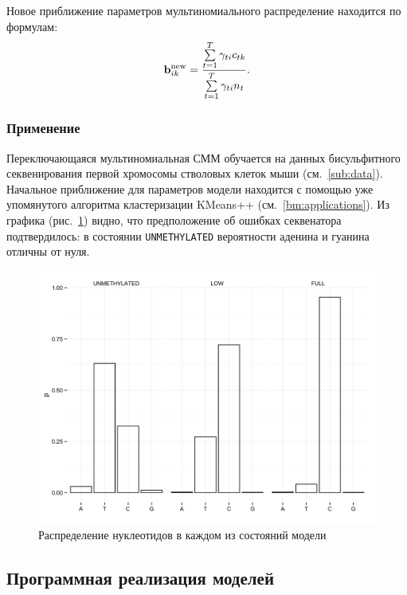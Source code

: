 Новое приближение параметров мультиномиального распределение находится по
формулам:
\begin{align*}
  \mathbf{b}^{\operatorname{new}}_{ik}
  = \frac{\sum\limits_{t = 1}^T \gamma_{ti} c_{tk}} {\sum\limits_{t = 1}^T \gamma_{ti} n_t}.
\end{align*}


\subsubsection{Применение}

Переключающаяся мультиномиальная СММ обучается на данных бисульфитного секвенирования
первой хромосомы стволовых клеток мыши (см.~\ref{sub:data}). Начальное приближение
для параметров модели находится с помощью уже упомянутого алгоритма кластеризации
KMeans++ (см.~\ref{bm:applications}). Из графика (рис.~\ref{fig:multinomial}) видно,
что предположение об ошибках секвенатора подтвердилось: в состоянии \texttt{UNMETHYLATED}
вероятности аденина и гуанина отличны от нуля.


\FloatBarrier
\begin{figure}[h]
  \centering
  \includegraphics[width=.8\textwidth]{images/multinomial}
  \caption{Распределение нуклеотидов в каждом из состояний модели}
  \label{fig:multinomial}
\end{figure}
\FloatBarrier


\subsection{Программная реализация моделей}
\label{sub:implementation}

